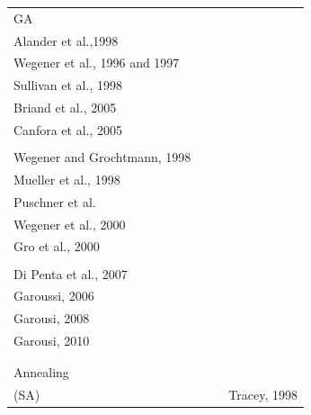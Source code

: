 \documentclass{bmcart}
\begin{document}
\begin{table}[h]
\begin{tabular}{p{2.4cm}|p{3.8cm}|p{3.8cm}|p{3.0cm}|}
\begin{minipage}{0.1\textwidth}\small GA \end{minipage}                                                              & \cellcolor[HTML]{FFFFFF} \begin{minipage}{0.3\textwidth}   \small \textnormal{ \\  Alander et al.,1998 \citep{Alander} \\ Wegener et al., 1996 and 1997 \citep{Wegener1997}\citep{J.WegenerK.GrimmM.GrochtmannH.Sthamer1996} \\  Sullivan et al., 1998 \citep{Sullivan} \\ Briand et al., 2005 \citep{Briand2005} \\ Canfora et al., 2005 \citep{Canfora}  \\ }\end{minipage} & \cellcolor[HTML]{FFFFFF} \begin{minipage}{0.3\textwidth} \small \textrm{  \\ Wegener and Grochtmann, 1998 \citep{Wegener1998} \\  Mueller et al., 1998 \citep{Mueller1998} \\ Puschner et al. \citep{Puschner1998} \\ Wegener et al., 2000 \citep{Stations} \\ Gro et al., 2000 \citep{Gross2000}  \\ }\end{minipage}& \cellcolor[HTML]{FFFFFF} \begin{minipage}{0.22\textwidth}   \small \textnormal{ \\  Di Penta et al., 2007 \citep{Penta2007} \\ Garoussi, 2006 \citep{Garousi2006} \\ Garousi, 2008 \citep{Garousi2008} \\ Garousi, 2010 \citep{Garousi2010} \\ } \end{minipage} \\[2ex] \cline{2-4} 
\begin{minipage}{0.1\textwidth}\small Simulated \\ Annealing \\ (SA) \end{minipage}                                                             & \cellcolor[HTML]{FFFFFF} & \cellcolor[HTML]{FFFFFF} & \cellcolor[HTML]{FFFFFF} \begin{minipage}{0.3\textwidth}   \small  Tracey, 1998 \citep{Tracey1998} \end{minipage} \\[2ex] \cline{2-4}

\end{tabular}
\end{table}
\end{document}
